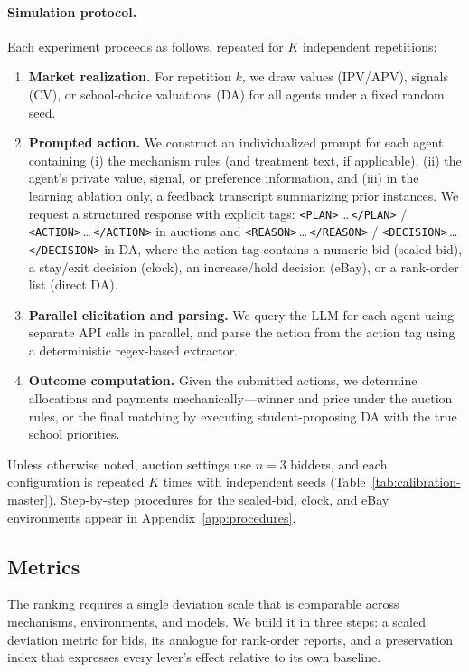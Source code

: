 \paragraph{Simulation protocol.}
Each experiment proceeds as follows, repeated for $K$ independent repetitions:
\begin{enumerate}
    \item \textbf{Market realization.} For repetition $k$, we draw values
    (IPV/APV), signals (CV), or school-choice valuations (DA) for all agents
    under a fixed random seed.
    \item \textbf{Prompted action.} We construct an individualized prompt for
    each agent containing (i) the mechanism rules (and treatment text, if
    applicable), (ii) the agent's private value, signal, or preference
    information, and (iii) in the learning ablation only, a feedback transcript
    summarizing prior instances. We request a structured response with explicit
    tags: \texttt{<PLAN>}\,\ldots\,\texttt{</PLAN>} /
    \texttt{<ACTION>}\,\ldots\,\texttt{</ACTION>} in auctions and
    \texttt{<REASON>}\,\ldots\,\texttt{</REASON>} /
    \texttt{<DECISION>}\,\ldots\,\texttt{</DECISION>} in DA, where the action
    tag contains a numeric bid (sealed bid), a stay/exit decision (clock), an
    increase/hold decision (eBay), or a rank-order list (direct DA).
    \item \textbf{Parallel elicitation and parsing.} We query the LLM for each
    agent using separate API calls in parallel, and parse the action from the
    action tag using a deterministic regex-based extractor.
    \item \textbf{Outcome computation.} Given the submitted actions, we
    determine allocations and payments mechanically---winner and price under
    the auction rules, or the final matching by executing student-proposing DA
    with the true school priorities.
\end{enumerate}
Unless otherwise noted, auction settings use $n=3$ bidders, and each
configuration is repeated $K$ times with independent seeds
(Table~\ref{tab:calibration-master}). Step-by-step procedures for the
sealed-bid, clock, and eBay environments appear in
Appendix~\ref{app:procedures}.

\subsection{Metrics}\label{sec:metrics}

The ranking requires a single deviation scale that is comparable across
mechanisms, environments, and models. We build it in three steps: a scaled
deviation metric for bids, its analogue for rank-order reports, and a
preservation index that expresses every lever's effect relative to its own
baseline.


